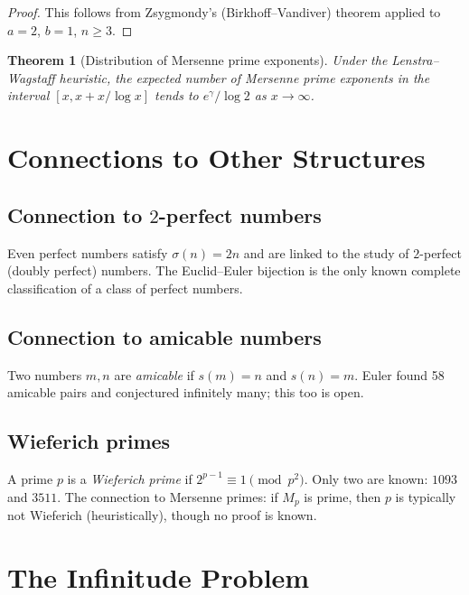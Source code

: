 \documentclass[12pt,a4paper]{amsart}
\newtheorem{theorem}{Theorem}[section]
\theoremstyle{definition}
\theoremstyle{remark}
\begin{document}
\begin{proof}
This follows from Zsygmondy's (Birkhoff--Vandiver) theorem applied to
$a = 2$, $b = 1$, $n \geq 3$.
\end{proof}

\begin{theorem}[Distribution of Mersenne prime exponents]
Under the Lenstra--Wagstaff heuristic, the expected number of Mersenne prime
exponents in the interval $[x, x + x/\log x]$ tends to $e^\gamma / \log 2$
as $x \to \infty$.
\end{theorem}

\section{Connections to Other Structures}

\subsection{Connection to $2$-perfect numbers}

Even perfect numbers satisfy $\sigma(n) = 2n$ and are linked to the study of
$2$-perfect (doubly perfect) numbers.
The Euclid--Euler bijection is the only known complete classification of a
class of perfect numbers.

\subsection{Connection to amicable numbers}

Two numbers $m, n$ are \emph{amicable} if $s(m) = n$ and $s(n) = m$.
Euler found 58 amicable pairs and conjectured infinitely many; this too is open.

\subsection{Wieferich primes}

A prime $p$ is a \emph{Wieferich prime} if $2^{p-1} \equiv 1 \pmod{p^2}$.
Only two are known: $1093$ and $3511$.
The connection to Mersenne primes: if $M_p$ is prime, then $p$ is typically
not Wieferich (heuristically), though no proof is known.

\section{The Infinitude Problem}
\end{document}
